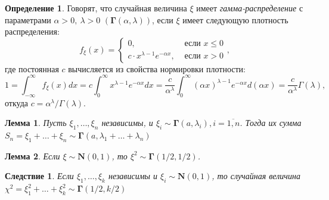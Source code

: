 \documentclass[oneside,final,14pt]{extreport}
\theoremstyle{plain}
\newtheorem*{lem}{Лемма}
\newtheorem*{crlr}{Следствие}
\theoremstyle{definition}
\newtheorem*{defn}{Определение}
\theoremstyle{named}
\begin{document}
\begin{defn}
    Говорят, что случайная величина $\xi$ имеет {\it гамма-распределение} с параметрами $\alpha > 0,~ \lambda > 0$ $(\mathbf{\Gamma}(\alpha, \lambda))$, если $\xi$ имеет следующую плотность распределения:
    \begin{equation*}
        f_{\xi}(x)=\left\{\begin{array}{ll}
        0, & \text { если } x \leqslant 0 \\
        c \cdot x^{\lambda-1} e^{-\alpha x}, & \text { если } x>0
        \end{array}\right.,
    \end{equation*}
    где постоянная $c$ вычисляется из свойства нормировки плотности:
    \begin{equation*}
        1=\int_{-\infty}^{\infty} f_{\xi}(x) d x=c \int_{0}^{\infty} x^{\lambda-1} e^{-\alpha x} d x=\frac{c}{\alpha^{\lambda}} \int_{0}^{\infty}(\alpha x)^{\lambda-1} e^{-\alpha x} d(\alpha x)=\frac{c}{\alpha^{\lambda}} \Gamma(\lambda),
    \end{equation*}
    откуда $c=\alpha^{\lambda} / \Gamma(\lambda)$.
\end{defn}

\begin{lem}
    Пусть $\xi_{1}, \ldots, \xi_{n}$ независимы, и $\xi_i \sim \mathbf{\Gamma}(a, \lambda_i), i=\overline{1,n}$. Тогда их сумма $S_{n}=\xi_{1}+\ldots+\xi_{n} \sim \mathbf{\Gamma}(a, \lambda_1 + \ldots + \lambda_n)$
\end{lem}
\begin{lem}
    Если $\xi \sim \mathbf{N}(0,1)$, то $\xi^2 \sim \mathbf{\Gamma}(1/2, 1/2)$.
\end{lem}
\begin{crlr}
    Если $\xi_{1}, \ldots, \xi_{k}$ независимы и $\xi_i \sim \mathbf{N}(0,1)$, то случайная величина $\chi^{2}=\xi_{1}^{2}+\ldots+\xi_{k}^{2} \sim \mathbf{\Gamma}(1/2, k/2)$
\end{crlr}
\end{document}
